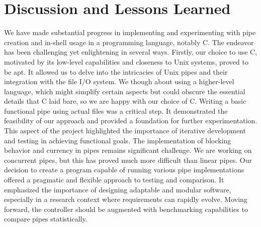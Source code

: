 \section{Discussion and Lessons Learned}
We have made substantial progress in implementing and experimenting with pipe creation and in-shell usage in a programming language, notably C. The endeavor has been challenging yet enlightening in several ways. Firstly, our choice to use C, motivated by its low-level capabilities and closeness to Unix systems, proved to be apt. It allowed us to delve into the intricacies of Unix pipes and their integration with the file I/O system. We though about using a higher-level language, which might simplify certain aspects but could obscure the essential details that C laid bare, so we are happy with our choice of C. Writing a basic functional pipe using actual files was a critical step. It demonstrated the feasibility of our approach and provided a foundation for further experimentation. This aspect of the project highlighted the importance of iterative development and testing in achieving functional goals. The implementation of blocking behavior and currency in pipes remains significant challenge. We are working on concurrent pipes, but this has proved much more difficult than linear pipes. Our decision to create a program capable of running various pipe implementations offered a pragmatic and flexible approach to testing and comparison. It emphasized the importance of designing adaptable and modular software, especially in a research context where requirements can rapidly evolve. Moving forward, the controller should be augmented with benchmarking capabilities to compare pipes statistically. 




